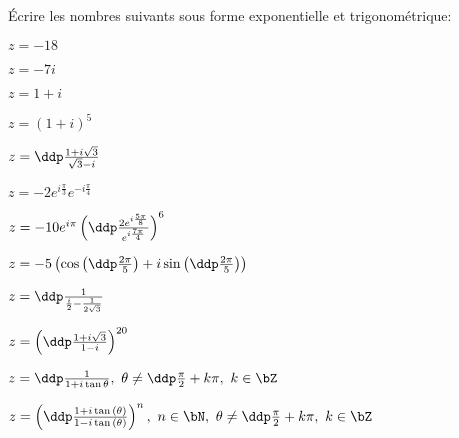 
\begin{exercice}  \;
\'Ecrire les nombres suivants sous forme exponentielle et trigonom\'etrique:
\begin{enumerate}
\begin{minipage}[t]{0.45\textwidth}
\item $z=-18$
\item $z=-7i$
\item $z=1+i$
\item $z=(1+i)^5$ 
\item $z=\ddp\frac{1+i\sqrt{3}}{\sqrt{3}-i}$ 
\item $z=-2e^{i\frac{\pi}{3}}e^{-i\frac{\pi}{4}}$
\item $z=-10e^{i\pi}\left(\ddp\frac{2e^{i\frac{5\pi}{8}}}{e^{i\frac{7\pi}{4}}}\right)^6$
\end{minipage}
\begin{minipage}[t]{0.45\textwidth}
\item $z=-5\left(\cos{\left(\ddp\frac{2\pi}{5}\right)} +i\sin{\left(\ddp\frac{2\pi}{5}\right)}  \right)$
\item $z=\ddp\frac{1}{\frac{i}{2}-\frac{1}{2\sqrt{3}}}$
\item $z=\left( \ddp\frac{1+i\sqrt{3}}{1-i}  \right)^{20}$
\item $z=\ddp\frac{1}{1+i\tan{\theta}},\ \theta\not= \ddp\frac{\pi}{2}+k\pi,\ k\in\bZ$
\item $z=\left( \ddp\frac{1+i\tan{(\theta)}}{1-i\tan{(\theta)}}  \right)^n,\ n\in\bN,\ \theta\not= \ddp\frac{\pi}{2}+k\pi,\ k\in\bZ$
\end{minipage}
\end{enumerate}
\end{exercice}